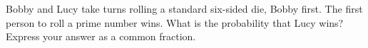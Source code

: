 Bobby and Lucy take turns rolling a standard six-sided die, Bobby first. The first person to roll a prime number wins. What is the probability that Lucy wins? Express your answer as a common fraction.
